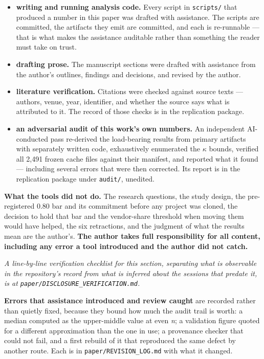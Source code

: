 \documentclass[conference]{IEEEtran}
\begin{document}
\begin{itemize}
\item \textbf{writing and running analysis code.} Every script in \texttt{scripts/\allowbreak{}} that produced a number in this paper was drafted with assistance. The scripts are committed, the artifacts they emit are committed, and each is re-runnable --- that is what makes the assistance auditable rather than something the reader must take on trust.
\item \textbf{drafting prose.} The manuscript sections were drafted with assistance from the author's outlines, findings and decisions, and revised by the author.
\item \textbf{literature verification.} Citations were checked against source texts --- authors, venue, year, identifier, and whether the source says what is attributed to it. The record of those checks is in the replication package.
\item \textbf{an adversarial audit of this work's own numbers.} An independent AI-conducted pass re-derived the load-bearing results from primary artifacts with separately written code, exhaustively enumerated the $\kappa$ bounds, verified all 2,491 frozen cache files against their manifest, and reported what it found --- including several errors that were then corrected. Its report is in the replication package under \texttt{audit/\allowbreak{}}, unedited.
\end{itemize}

\textbf{What the tools did not do.} The research questions, the study design, the pre-registered 0.80 bar and its commitment before any project was cloned, the decision to hold that bar and the vendor-share threshold when moving them would have helped, the six retractions, and the judgment of what the results mean are the author's. \textbf{The author takes full responsibility for all content, including any error a tool introduced and the author did not catch.}

\emph{A line-by-line verification checklist for this section, separating what is observable in the repository's record from what is inferred about the sessions that predate it, is at \texttt{paper/\allowbreak{}DISCLOSURE\_\allowbreak{}VERIFICATION.\allowbreak{}md}.}

\textbf{Errors that assistance introduced and review caught} are recorded rather than quietly fixed, because they bound how much the audit trail is worth: a median computed as the upper-middle value at even \emph{n}; a validation figure quoted for a different approximation than the one in use; a provenance checker that could not fail, and a first rebuild of it that reproduced the same defect by another route. Each is in \texttt{paper/\allowbreak{}REVISION\_\allowbreak{}LOG.\allowbreak{}md} with what it changed.
\end{document}
